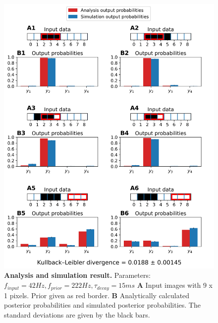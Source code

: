 \begin{figure}
  \includegraphics[width=\linewidth]{figures/1D/1D_42_222_15.png}
     \caption{\textbf{Analysis and simulation result. } Parameters: $f_{input} = 42 Hz, f_{prior} = 222 Hz, \tau_{decay} = 15 ms$ \textbf{A} Input images with 9 x 1 pixels. Prior given as red border. \textbf{B} Analytically calculated posterior probabilities and simulated posterior probabilities. The standard deviations are given by the black bars.}
  \label{fig:1D_42_222_15}
\end{figure}

